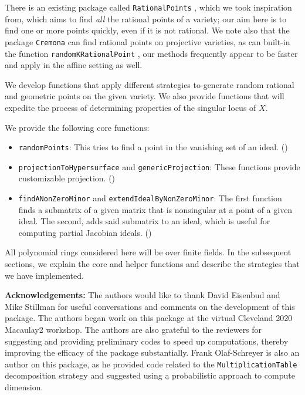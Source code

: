 \documentclass[11pt]{amsart}
\theoremstyle{definition}
\begin{document}
    There is an existing package called {\tt RationalPoints} \cite{RationalPointsSource}, which we took inspiration from, which aims to find \emph{all} the rational points of a variety; our aim here is to find one or more points quickly, even if it is not rational.  We note also that the package {\tt Cremona} \cite{CremonaSource} can find rational points on projective varieties, as can built-in the function {\tt randomKRationalPoint} \cite{M2}, our methods frequently appear to be faster and apply in the affine setting as well.

    We develop functions that apply different strategies to generate random rational and geometric points on the given variety. We also provide functions that will expedite the process of determining properties of the singular locus of $X$.%

    We provide the following core functions:
    \begin{itemize}    
    \item {\tt randomPoints}:  This tries to find a point in the vanishing set of an ideal. ()
    \item {\tt projectionToHypersurface} and {\tt genericProjection}: These functions provide customizable projection. () 	
    \item {\tt findANonZeroMinor} and {\tt extendIdealByNonZeroMinor}:  The first function finds a submatrix of a given matrix that is nonsingular at a point of a given ideal.  The second, adds said submatrix to an ideal, which is useful for computing partial Jacobian ideals.  ()          
    \end{itemize}

    All polynomial rings considered here will be over finite fields. In the subsequent sections, we explain  the core and helper functions and describe the strategies that we have implemented.

   \vspace{1em}
    \noindent \textbf{Acknowledgements:} The authors would like to thank David Eisenbud and Mike Stillman for useful conversations and comments on the development of this package.  The authors began work on this package at the virtual Cleveland 2020 Macaulay2 workshop. The authors are also grateful to the reviewers for suggesting and providing preliminary codes to speed up computations, thereby improving the efficacy of the package substantially.  Frank Olaf-Schreyer is also an author on this package, as he provided code related to the {\tt MultiplicationTable} decomposition strategy and suggested using a probabilistic approach to compute dimension.
\end{document}
